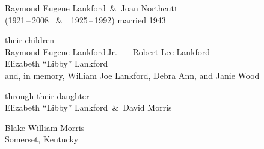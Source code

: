 
\cleardoublepage
\thispagestyle{laempty}
\vspace*{0.12\textheight}
\begin{center}
    \par
    \vspace{0.4em}
    \brassrule[36pt]\par
\end{center}
\vspace{2.4em}

\begin{center}
    \begin{minipage}{0.8\textwidth}
        \centering
        \displayfont\itshape\large

        Raymond Eugene Lankford\ \&\ Joan Northcutt\\
        {\monofont\small{}\color{walnutmute}(1921\,--\,2008 \ \&\ \ 1925\,--\,1992)\,\textperiodcentered\,married 1943}\\
        \vspace{1.4em}

        {\normalsize their children}\\
        Raymond Eugene Lankford\,Jr. \ \textperiodcentered\ \ Robert Lee Lankford\\
        Elizabeth ``Libby'' Lankford\\
        {\monofont\footnotesize{}\color{walnutmute}and, in memory, William Joe Lankford, Debra Ann, and Janie Wood}\\
        \vspace{1.4em}

        {\normalsize through their daughter}\\
        Elizabeth ``Libby'' Lankford\ \&\ David Morris\\
        \vspace{1.4em}

        Blake William Morris\\
        {\monofont\small{}\color{walnutmute}Somerset, Kentucky}
    \end{minipage}
\end{center}
\vfill
